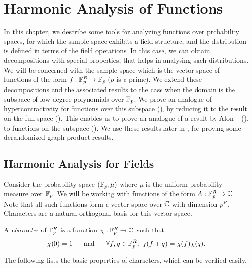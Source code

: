 
\chapter{Harmonic Analysis of Functions}
\label{ch:harmonic}

In this chapter, we describe some tools for analyzing functions over probability
spaces, for which the sample space exhibits a field structure, and the 
distribution is defined in terms of the field operations.  In this case, we can 
obtain decompositions with special properties, that helps in 
analysing such distributions. We will be concerned with
the sample space which is the vector space of functions of the 
form $f:\mathbb F_p^R \rightarrow \mathbb F_p$ ($p$ is a prime).
 We  extend these decompositions and the associated results
 to the case when the domain is the subspace of low degree
 polynomials over $\mathbb F_p$. We prove an  analogue of  hypercontractivity
  for functions over this subspace (), by 
 reducing it to the result  on the full space ().
 This enables us to prove an analogue of a
  result by Alon \etal ~\cite{AlonDFS2004} (), to 
  functions on the subspace (). We use
these results later in , for proving some
derandomized graph product results.
  
\section{Harmonic Analysis for Fields}
\label{sec:harmonic}

Consider the probability space $(\mathbb F_p,\mu)$ where $\mu$ is the uniform
probability measure over $\mathbb F_p$. We will be working with functions of the form
$A:\mathbb F_p^R \rightarrow \mathbb C$. Note that all such functions form a vector space over
$\mathbb C$ with dimension $p^R$. Characters are a natural orthogonal basis for this
vector space.

\begin{definition}[Character] A \emph{character} of $\mathbb F_p^R$ is a function
$\chi:\mathbb F_p^R \rightarrow \mathbb C$ such that 
$$\chi(0) = 1~~~~ \text{ and }~~~~ \forall f,g
\in \mathbb F_p^R,~ \chi(f+g) = \chi(f)\chi(g).$$ 
\end{definition}

The following lists the basic properties of characters, which can
be verified easily.

